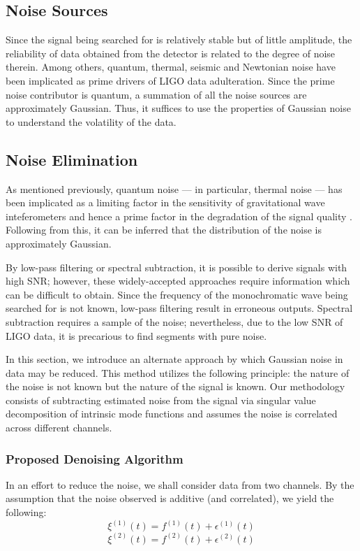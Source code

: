 \documentclass[onecolumn, groupedaddress, 10pt]{revtex4-1}
\begin{document}
\subsection{Noise Sources}
Since the signal being searched for is relatively stable but of little amplitude, the reliability of data obtained from the detector is related to the degree of noise therein. Among others, quantum, thermal, seismic and Newtonian noise have been implicated as prime drivers of LIGO data adulteration. Since the prime noise contributor is quantum, a summation of all the noise sources are approximately Gaussian. Thus, it suffices to use the properties of Gaussian noise to understand the volatility of the data.

\subsection{Noise Elimination}
As mentioned previously, quantum noise --- in particular, thermal noise --- has been implicated as a limiting factor in the sensitivity of gravitational wave inteferometers and hence a prime factor in the degradation of the signal quality \citep{Saulson}. Following from this, it can be inferred that the distribution of the noise is approximately Gaussian.

By low-pass filtering or spectral subtraction, it is possible to derive signals with high SNR; however, these widely-accepted approaches require information which can be difficult to obtain. Since the frequency of the monochromatic wave being searched for is not known, low-pass filtering result in erroneous outputs. Spectral subtraction requires a sample of the noise; nevertheless, due to the low SNR of LIGO data, it is precarious to find segments with pure noise.

In this section, we introduce an alternate approach by which Gaussian noise in data may be reduced. This method utilizes the following principle: the nature of the noise is not known but the nature of the signal is known. Our methodology consists of subtracting estimated noise from the signal via singular value decomposition of intrinsic mode functions and assumes the noise is correlated across different channels.

\subsubsection{Proposed Denoising Algorithm}
In an effort to reduce the noise, we shall consider data from two channels. By the assumption that the noise observed is additive (and correlated), we yield the following:
\begin{equation}
\xi^{(1)}(t) = f^{(1)}(t) + \epsilon^{(1)}(t)
\end{equation}
\begin{equation}
\xi^{(2)}(t) = f^{(2)}(t) + \epsilon^{(2)}(t)
\end{equation}
\end{document}
